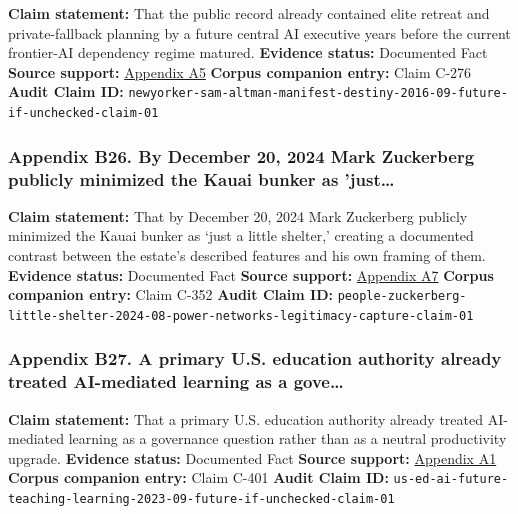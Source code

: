 \documentclass[
  american,
  11pt,
  letterpaper,
]{article}
\begin{document}
\textbf{Claim statement:} That the public record already contained elite
retreat and private-fallback planning by a future central AI executive
years before the current frontier-AI dependency regime matured.
\textbf{Evidence status:} Documented Fact \textbf{Source support:}
\hyperref[ch-09-appendix-a5-sam-altman-s-manifest-destiny]{Appendix A5}
\textbf{Corpus companion entry:} Claim C-276 \textbf{Audit Claim ID:}
\texttt{newyorker-sam-altman-manifest-destiny-2016-09-future-if-unchecked-claim-01}

\subsubsection{Appendix B26. By December 20, 2024 Mark Zuckerberg
publicly minimized the Kauai bunker as
'just\ldots{}}\label{ch-09-appendix-b26-by-december-20-2024-mark-zuckerberg-publicly-minimized-the-kauai-bunker-as-just}

\textbf{Claim statement:} That by December 20, 2024 Mark Zuckerberg
publicly minimized the Kauai bunker as `just a little shelter,' creating
a documented contrast between the estate's described features and his
own framing of them. \textbf{Evidence status:} Documented Fact
\textbf{Source support:}
\hyperref[ch-09-appendix-a7-mark-zuckerberg-downplays-his-5-000-square-foot-underground-bunker-in-hawaii-just-a-little-shelter]{Appendix
A7} \textbf{Corpus companion entry:} Claim C-352 \textbf{Audit Claim
ID:}
\texttt{people-zuckerberg-little-shelter-2024-08-power-networks-legitimacy-capture-claim-01}

\subsubsection{Appendix B27. A primary U.S. education authority already
treated AI-mediated learning as a
gove\ldots{}}\label{ch-09-appendix-b27-a-primary-u-s-education-authority-already-treated-ai-mediated-learning-as-a-gove}

\textbf{Claim statement:} That a primary U.S. education authority
already treated AI-mediated learning as a governance question rather
than as a neutral productivity upgrade. \textbf{Evidence status:}
Documented Fact \textbf{Source support:}
\hyperref[ch-09-appendix-a1-artificial-intelligence-and-the-future-of-teaching-and-learning-insights-and-recommendations]{Appendix
A1} \textbf{Corpus companion entry:} Claim C-401 \textbf{Audit Claim
ID:}
\texttt{us-ed-ai-future-teaching-learning-2023-09-future-if-unchecked-claim-01}
\end{document}
